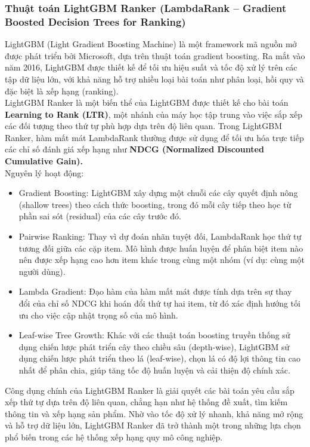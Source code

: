 \subsubsection{Thuật toán LightGBM Ranker (LambdaRank – Gradient Boosted Decision Trees for Ranking)}
\indent \indent LightGBM (Light Gradient Boosting Machine) là một framework mã nguồn mở được phát triển bởi Microsoft, dựa trên thuật toán gradient boosting. Ra mắt vào năm 2016, LightGBM được thiết kế để tối ưu hiệu suất và tốc độ xử lý trên các tập dữ liệu lớn, với khả năng hỗ trợ nhiều loại bài toán như phân loại, hồi quy và đặc biệt là xếp hạng (ranking).\\
\indent LightGBM Ranker là một biến thể của LightGBM được thiết kế cho bài toán \textbf{Learning to Rank (LTR)}, một nhánh của máy học tập trung vào việc sắp xếp các đối tượng theo thứ tự phù hợp dựa trên độ liên quan. Trong LightGBM Ranker, hàm mất mát LambdaRank thường được sử dụng để tối ưu hóa trực tiếp các chỉ số đánh giá xếp hạng như \textbf{NDCG (Normalized Discounted Cumulative Gain).}\\
\indent Nguyên lý hoạt động:
\begin{itemize}
    \item[-] Gradient Boosting: LightGBM xây dựng một chuỗi các cây quyết định nông (shallow trees) theo cách thức boosting, trong đó mỗi cây tiếp theo học từ phần sai sót (residual) của các cây trước đó.
    \item[-] Pairwise Ranking: Thay vì dự đoán nhãn tuyệt đối, LambdaRank học thứ tự tương đối giữa các cặp item. Mô hình được huấn luyện để phân biệt item nào nên được xếp hạng cao hơn item khác trong cùng một nhóm (ví dụ: cùng một người dùng).
    \item[-] Lambda Gradient: Đạo hàm của hàm mất mát được tính dựa trên sự thay đổi của chỉ số NDCG khi hoán đổi thứ tự hai item, từ đó xác định hướng tối ưu cho việc cập nhật trọng số của mô hình.
    \item[-] Leaf-wise Tree Growth: Khác với các thuật toán boosting truyền thống sử dụng chiến lược phát triển cây theo chiều sâu (depth-wise), LightGBM sử dụng chiến lược phát triển theo lá (leaf-wise), chọn lá có độ lợi thông tin cao nhất để phân chia, giúp tăng tốc độ huấn luyện và cải thiện độ chính xác.
\end{itemize}
\indent \indent Công dụng chính của LightGBM Ranker là giải quyết các bài toán yêu cầu sắp xếp thứ tự dựa trên độ liên quan, chẳng hạn như hệ thống đề xuất, tìm kiếm thông tin và xếp hạng sản phẩm. Nhờ vào tốc độ xử lý nhanh, khả năng mở rộng và hỗ trợ dữ liệu lớn, LightGBM Ranker đã trở thành một trong những lựa chọn phổ biến trong các hệ thống xếp hạng quy mô công nghiệp.

